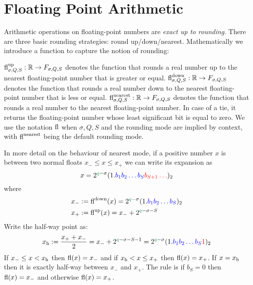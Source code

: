 
\section{Floating Point Arithmetic}
Arithmetic operations on floating-point numbers are  \emph{exact up to rounding}. There are three basic rounding strategies: round up/down/nearest. Mathematically we introduce a function to capture the notion of rounding:

\begin{definition}[rounding] ${\rm fl}^{\rm up}_{\ensuremath{\sigma},Q,S} : \mathbb R \rightarrow F_{\ensuremath{\sigma},Q,S}$ denotes the function that rounds a real number up to the nearest floating-point number that is greater or equal. ${\rm fl}^{\rm down}_{\ensuremath{\sigma},Q,S} : \mathbb R \rightarrow F_{\ensuremath{\sigma},Q,S}$ denotes the function that rounds a real number down to the nearest floating-point number that is less or equal. ${\rm fl}^{\rm nearest}_{\ensuremath{\sigma},Q,S} : \mathbb R \rightarrow F_{\ensuremath{\sigma},Q,S}$ denotes the function that rounds a real number to the nearest floating-point number. In case of a tie, it returns the floating-point number whose least significant bit is equal to zero. We use the notation ${\rm fl}$ when $\ensuremath{\sigma},Q,S$ and the rounding mode are implied by context, with ${\rm fl}^{\rm nearest}$ being the default rounding mode. \end{definition}

In more detail on the behaviour of nearest mode, if a positive number $x$ is between two normal floats $x_- \ensuremath{\leq} x \ensuremath{\leq} x_+$ we can write its expansion as
\[
x = 2^{\green{q}-\ensuremath{\sigma}} (1.\blue{b_1b_2\ensuremath{\ldots}b_S}\red{b_{S+1}\ensuremath{\ldots}})_2
\]
where
\begin{align*}
x_- &:= {\rm fl}^{\rm down}(x) = 2^{\green{q}-\ensuremath{\sigma}} (1.\blue{b_1b_2\ensuremath{\ldots}b_S})_2 \\
x_+ &:= {\rm fl}^{\rm up}(x) = x_- + 2^{\green{q}-\ensuremath{\sigma}-S}
\end{align*}
Write the half-way point as:
\[
x_{\rm h} := {x_+ + x_- \over 2} = x_- + 2^{\green{q}-\ensuremath{\sigma}-S-1} = 2^{\green{q}-\ensuremath{\sigma}} (1.\blue{b_1b_2\ensuremath{\ldots}b_S}\red{1})_2
\]
If $x_- \ensuremath{\leq} x < x_{\rm h}$ then ${\rm fl}(x) = x_-$ and if $x_{\rm h} < x \ensuremath{\leq} x_+$ then ${\rm fl}(x) = x_+$. If $x = x_{\rm h}$ then it is exactly half-way between $x_-$ and $x_+$. The rule is if $b_S = 0$ then ${\rm fl}(x) = x_-$ and otherwise ${\rm fl}(x) = x_+$.

